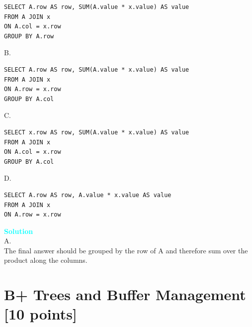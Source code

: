 \documentclass[10pt]{article}
\newenvironment{solution}
    { \begin{mdframed}[backgroundcolor=gray!10] \textcolor{cyan}{\textbf{Solution}} \\}
    {  \end{mdframed}}
\begin{document}
\begin{enumerate}
	      \begin{lstlisting} 
SELECT A.row AS row, SUM(A.value * x.value) AS value 
FROM A JOIN x
ON A.col = x.row
GROUP BY A.row
\end{lstlisting}


	      B.
	      \begin{lstlisting}
SELECT A.row AS row, SUM(A.value * x.value) AS value 
FROM A JOIN x
ON A.row = x.row
GROUP BY A.col
\end{lstlisting}
	      C.
	      \begin{lstlisting} 
SELECT x.row AS row, SUM(A.value * x.value) AS value 
FROM A JOIN x
ON A.col = x.row
GROUP BY A.col
\end{lstlisting}
	      D.
	      \begin{lstlisting}
SELECT A.row AS row, A.value * x.value AS value 
FROM A JOIN x
ON A.row = x.row
\end{lstlisting}

	      \begin{solution}
		      A. \\
		      The final answer should be grouped by the row of A and therefore sum over the product along the columns.
	      \end{solution}

\end{enumerate}





\newpage
\section{B+ Trees and Buffer Management \textbf{[10 points]}}
\end{document}
